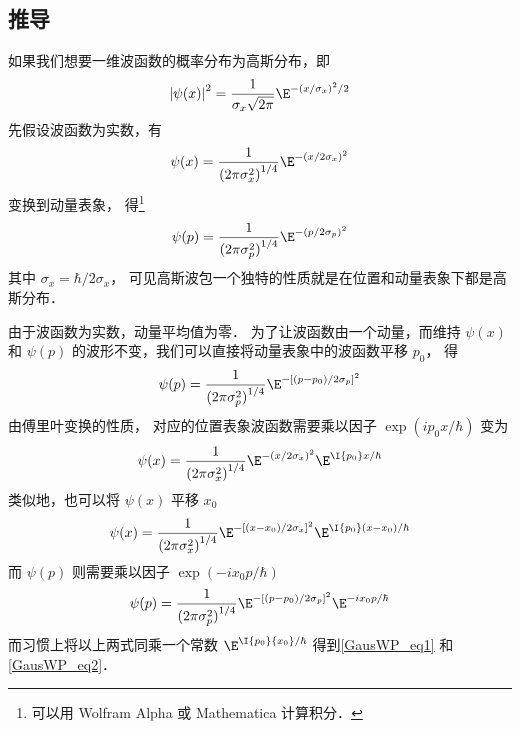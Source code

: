 \subsection{推导}

如果我们想要一维波函数的概率分布为高斯分布，即
\begin{equation}
{\left| {\psi (x)} \right|^2} = \frac{1}{{\sigma_x \sqrt {2\pi } }}{\E^{ - {{(x/\sigma_x )}^2}/2}}
\end{equation}
先假设波函数为实数，有
\begin{equation}
\psi (x) = \frac{1}{{{{(2\pi {\sigma_x ^2})}^{1/4}}}}{\E^{ - {{(x/2\sigma_x )}^2}}}
\end{equation}
变换到动量表象，%
得\footnote{可以用 Wolfram Alpha 或 Mathematica 计算积分．}
\begin{equation}
\psi (p) = \frac{1}{{{{(2\pi {\sigma_p ^2})}^{1/4}}}}{\E^{ - {{(p/2\sigma_p )}^2}}}
\end{equation}
其中 ${\sigma _x} = \hbar /2{\sigma _x}$， %
可见高斯波包一个独特的性质就是在位置和动量表象下都是高斯分布．

由于波函数为实数，动量平均值为零．%
为了让波函数由一个动量，而维持 $\psi(x)$ 和 $\psi(p)$ %
的波形不变，我们可以直接将动量表象中的波函数平移 $p_0$， 得
\begin{equation}
\psi (p) = \frac{1}{{{{(2\pi \sigma _p^2)}^{1/4}}}}{\E^{ - {{[(p - {p_0})/2{\sigma _p}]}^2}}}
\end{equation}
由傅里叶变换的性质，%
对应的位置表象波函数需要乘以因子 $\exp(i p_0 x/\hbar)$ 变为
\begin{equation}
\psi (x) = \frac{1}{{{{(2\pi {\sigma_x ^2})}^{1/4}}}}{\E^{ - {{(x/2\sigma_x )}^2}}}{\E^{\I {{{p_0}}}x/{\hbar }}}
\end{equation}
类似地，也可以将 $\psi(x)$ 平移 $x_0$ 
\begin{equation}
\psi (x) = \frac{1}{{{{(2\pi {\sigma_x ^2})}^{1/4}}}}{\E^{ - {{[(x-x_0)/2\sigma_x ]}^2}}}{\E^{\I {{{p_0}}}(x-x_0)/{\hbar }}}
\end{equation}
而 $\psi(p)$ 则需要乘以因子 $\exp ( - i{x_0}p/\hbar )$
\begin{equation}
\psi (p) = \frac{1}{{{{(2\pi \sigma _p^2)}^{1/4}}}}{\E^{ - {{[(p - {p_0})/2{\sigma _p}]}^2}}}{\E^{ - i{x_0}p/\hbar }}
\end{equation}
而习惯上将以上两式同乘一个常数%
 ${\E^{\I{p_0}{x_0}/\hbar }}$ 得到\autoref{GausWP_eq1} 和\autoref{GausWP_eq2}． 


